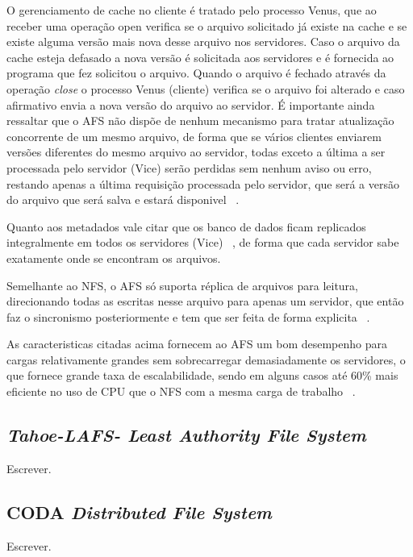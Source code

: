     O gerenciamento de cache no cliente é tratado pelo processo Venus, que ao receber uma operação open verifica se o arquivo solicitado já existe na cache e se existe alguma versão mais nova desse arquivo nos servidores. Caso o arquivo da cache esteja defasado a nova versão é solicitada aos servidores e é fornecida ao programa que fez solicitou o arquivo. Quando o arquivo é fechado através da operação \textit{close} o processo Venus (cliente) verifica se o arquivo foi alterado e caso afirmativo envia a nova versão do arquivo ao servidor. É importante ainda ressaltar que o AFS não dispõe de nenhum mecanismo para tratar atualização concorrente de um mesmo arquivo, de forma que se vários clientes enviarem versões diferentes do mesmo arquivo ao servidor, todas exceto a última a ser processada pelo servidor (Vice) serão perdidas sem nenhum aviso ou erro, restando apenas a última requisição processada pelo servidor, que será a versão do arquivo que será salva e estará disponivel ~\cite{coulouris}.
    
    Quanto aos metadados vale citar que os banco de dados ficam replicados integralmente em todos os servidores (Vice) ~\cite{coulouris}, de forma que cada servidor sabe exatamente onde se encontram os arquivos.
    
    Semelhante ao NFS, o AFS só suporta réplica de arquivos para leitura, direcionando todas as escritas nesse arquivo para apenas um servidor, que então faz o sincronismo posteriormente e tem que ser feita de forma explicita ~\cite{coulouris}.
    
    As caracteristicas citadas acima fornecem ao AFS um bom desempenho para cargas relativamente grandes sem sobrecarregar demasiadamente os servidores, o que fornece grande taxa de escalabilidade, sendo em alguns casos até 60\% mais eficiente no uso de CPU que o NFS com a mesma carga de trabalho ~\cite{coulouris}.
    
    \subsection{\textit{Tahoe-LAFS- Least Authority File System}}
    
    Escrever.
    
    \subsection{CODA \textit{Distributed File System}}
    
    Escrever.
    
